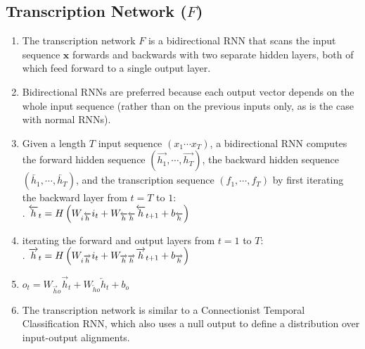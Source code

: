 \subsection{Transcription Network ($F$)}


\begin{enumerate}
    \item The transcription network $F$ is a bidirectional RNN that scans the input sequence $\bm{x}$ forwards and backwards with two separate hidden layers, both of which feed forward to a single output layer. 
    \hfill \cite{arxiv/1211.3711/Sequence-Transduction-RNN}

    \item Bidirectional RNNs are preferred because each output vector depends on the whole input sequence (rather than on the previous inputs only, as is the case with normal RNNs).
    \hfill \cite{arxiv/1211.3711/Sequence-Transduction-RNN}

    \item Given a length $T$ input sequence $(x_1 \cdots x_T )$, a bidirectional RNN computes the forward hidden sequence $(\overrightarrow{h_1}, \cdots , \overrightarrow{h_T} )$, the backward hidden sequence $(\overleftarrow{h_1}, \cdots , \overleftarrow{h_T} )$, and the transcription sequence $(f_1, \cdots , f_T )$ by first iterating the backward layer from $t = T$ to $1$:
    \hfill \cite{arxiv/1211.3711/Sequence-Transduction-RNN}
    \\[0.2cm]
    .\hfill
    $\overleftarrow{h}_ t = H\left(W_{i\overleftarrow{h}} i_t + W_{\overleftarrow{h} \overleftarrow{h}} \overleftarrow{h} _{t+1} + b_{\overleftarrow{h}}\right)$
    \hfill \cite{arxiv/1211.3711/Sequence-Transduction-RNN}
    
    
    \item iterating the forward and output layers from $t = 1$ to $T $:
    \hfill \cite{arxiv/1211.3711/Sequence-Transduction-RNN}
    \\[0.2cm]
    .\hfill
    $\overrightarrow{h}_ t = H\left(W_{i\overrightarrow{h}} i_t + W_{\overrightarrow{h} \overrightarrow{h}} \overrightarrow{h} _{t+1} + b_{\overrightarrow{h}}\right)$
    \hfill \cite{arxiv/1211.3711/Sequence-Transduction-RNN}

    \item $o_t = W_{\overrightarrow{h} o} \overrightarrow{h}_ t + W_{\overleftarrow{h} o}\overleftarrow{h}_ t + b_o $
    \hfill \cite{arxiv/1211.3711/Sequence-Transduction-RNN}

    \item The transcription network is similar to a Connectionist Temporal Classification RNN, which also uses a null output to define a distribution over input-output alignments.
    \hfill \cite{arxiv/1211.3711/Sequence-Transduction-RNN}
\end{enumerate}




